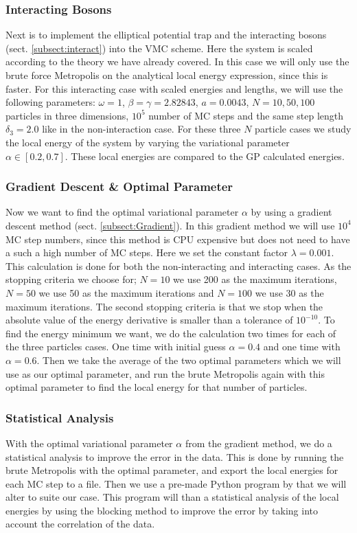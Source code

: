 \documentclass[12pt,a4paper,english]{article}
\begin{document}
\subsubsection{Interacting Bosons}
\label{subsubsect:Coding_int}
Next is to implement the elliptical potential trap and the interacting bosons (sect. \ref{subsect:interact}) into the VMC scheme. Here the system is scaled according to the theory we have already covered. In this case we will only use the brute force Metropolis on the analytical local energy expression, since this is faster. For this interacting case with scaled energies and lengths, we will use the following parameters: $\omega=1$, $\beta=\gamma=2.82843$, $a=0.0043$, $N=10,50,100$ particles in three dimensions, $10^5$ number of MC steps and the same step length $\delta_3=2.0$ like in the non-interaction case. For these three $N$ particle cases we study the local energy of the system by varying the variational parameter $\alpha\in[0.2,0.7]$. These local energies are compared to the GP calculated energies.

\subsubsection{Gradient Descent \& Optimal Parameter}
\label{subsubsect:Coding_gradient}
Now we want to find the optimal variational parameter $\alpha$ by using a gradient descent method (sect. \ref{subsect:Gradient}). In this gradient method we will use $10^4$ MC step numbers, since this method is CPU expensive but does not need to have a such a high number of MC steps. Here we set the constant factor $\lambda=0.001$. This calculation is done for both the non-interacting and interacting cases. As the stopping criteria we choose for; $N=10$ we use 200 as the maximum iterations, $N=50$ we use 50 as the maximum iterations and $N=100$ we use 30 as the maximum iterations. The second stopping criteria is that we stop when the absolute value of the energy derivative is smaller than a tolerance of $10^{-10}$. To find the energy minimum we want, we do the calculation two times for each of the three particles cases. One time with initial guess $\alpha=0.4$ and one time with $\alpha=0.6$. Then we take the average of the two optimal parameters which we will use as our optimal parameter, and run the brute Metropolis again with this optimal parameter to find the local energy for that number of particles.

\subsubsection{Statistical Analysis}
\label{subsubsect:Coding_statistical}
With the optimal variational parameter $\alpha$ from the gradient method, we do a statistical analysis to improve the error in the data. This is done by running the brute Metropolis with the optimal parameter, and export the local energies for each MC step to a file. Then we use a pre-made Python program by \citet{jonsson2018standard} that we will alter to suite our case. This program will than a statistical analysis of the local energies by using the blocking method to improve the error by taking into account the correlation of the data.
\end{document}
